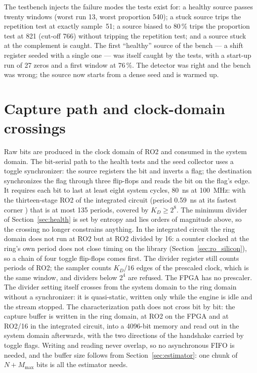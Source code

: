 The testbench injects the failure modes the tests exist for: a healthy
source passes twenty windows (worst run 13, worst proportion 540); a
stuck source trips the repetition test at exactly sample~51; a source
biased to 80\,\% trips the proportion test at 821 (cut-off 766) without
tripping the repetition test; and a source stuck at the complement is
caught. The
first ``healthy'' source of the bench --- a shift register seeded with a
single one --- was itself caught by the tests, with a start-up run of 27
zeros and a first window at 76\,\%. The detector was right and the bench
was wrong; the source now starts from a dense seed and is warmed up.

\section{Capture path and clock-domain crossings}
\label{sec:cdc}

Raw bits are produced in the clock domain of RO2 and consumed in the
system domain. The bit-serial path to the health tests and the seed
collector uses a toggle synchronizer: the source registers the bit and
inverts a flag; the destination synchronizes the flag through three
flip-flops and reads the bit on the flag's edge. It requires each bit to
last at least eight system cycles, 80~ns at 100~MHz: with the
thirteen-stage RO2 of the integrated circuit (period 0.59~ns at its
fastest corner \simu{}) that is at most 135 periods, covered by
$K_D \ge 2^{8}$. The minimum divider of
Section~\ref{sec:health} is set by entropy and lies orders of magnitude
above, so the crossing no longer constrains anything. In the integrated
circuit the ring domain does not run at RO2 but at RO2 divided by 16: a
counter clocked at the ring's own period does not close timing on the
library \est{} (Section~\ref{sec:ro_silicon}), so a chain of four toggle
flip-flops comes first. The divider register still counts periods of
RO2; the sampler counts $K_D/16$ edges of the prescaled clock, which is
the same window, and dividers below $2^{4}$ are refused. The \ac{FPGA}
has no prescaler. The divider setting itself crosses from the system
domain to the ring domain without a synchronizer: it is quasi-static,
written only while the engine is idle and the stream stopped. The
characterization path does not cross bit by bit:
the capture buffer is written in the ring domain, at RO2 on the
\ac{FPGA} and at RO2/16 in the integrated circuit, into a 4096-bit
memory and read out in the system domain afterwards, with the two
directions of the handshake carried by toggle flags. Writing and reading
never overlap, so no asynchronous FIFO is needed, and the buffer size
follows from Section~\ref{sec:estimator}: one chunk of $N + M_{\max}$
bits is all the estimator needs.

